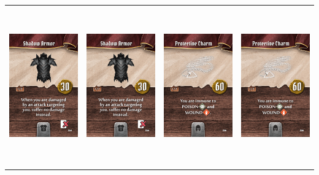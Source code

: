 \documentclass{minimal}
\begin{document}
{\begin{longtable}{llll}
\includegraphics[width=44mm,height=68mm]{./50-56/gh-051-shadow-armor.png} &
\includegraphics[width=44mm,height=68mm]{./50-56/gh-051-shadow-armor.png} &
\includegraphics[width=44mm,height=68mm]{./50-56/gh-052-protective-charm.png} &
\includegraphics[width=44mm,height=68mm]{./50-56/gh-052-protective-charm.png}\\ 

\end{longtable}}
\end{document}
